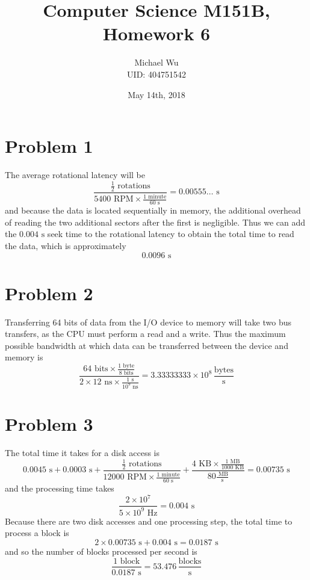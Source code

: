\documentclass[12pt]{article}
\begin{document}
\title{Computer Science M151B, Homework 6}
\date{May 14th, 2018}
\author{Michael Wu\\UID: 404751542}
\maketitle

\section*{Problem 1}

The average rotational latency will be
\[\frac{\frac{1}{2}\text{ rotations}}{5400\text{ RPM}\times \frac{1 \text{ minute}}{60 \text{ s}}}=0.00555\ldots \text{ s}\]
and because the data is located sequentially in memory, the additional overhead of reading the two additional sectors after the first is negligible.
Thus we can add the \(0.004 \text{ s}\) seek time to the rotational latency to obtain the total time to read the data, which is approximately
\[0.0096\text{ s}\]

\section*{Problem 2}

Transferring 64 bits of data from the I/O device to memory will take two bus transfers, as the CPU must perform a read and a write. Thus
the maximum possible bandwidth at which data can be transferred between the device and memory is
\[\frac{64 \text{ bits} \times \frac{1 \text{ byte}}{8 \text{ bits}}}{2\times 12 \text{ ns} \times \frac{1 \text{ s}}{10^9 \text{ ns}}}
=3.33333333 \times 10^8 \,\frac{\text{bytes}}{\text{s}}\]

\section*{Problem 3}

The total time it takes for a disk access is
\[0.0045 \text{ s}
+0.0003 \text{ s}
+\frac{\frac{1}{2}\text{ rotations}}{12000\text{ RPM}\times \frac{1 \text{ minute}}{60 \text{ s}}}
+\frac{4 \text{ KB}\times \frac{1\text{ MB}}{1000 \text{ KB}}}{80 \frac{\text{ MB}}{\text{s}}}
=0.00735 \text{ s}\]
and the processing time takes
\[\frac{2\times 10^7}{5\times 10^9 \text{ Hz}}=0.004 \text{ s}\]
Because there are two disk accesses and one processing step, the total time to process a block is
\[2\times 0.00735 \text{ s} + 0.004 \text{ s} = 0.0187 \text{ s}\]
and so the number of blocks processed per second is
\[\frac{1 \text{ block}}{0.0187 \text{ s}}=53.476 \,\frac{\text{blocks}}{\text{s}}\]
\end{document}
